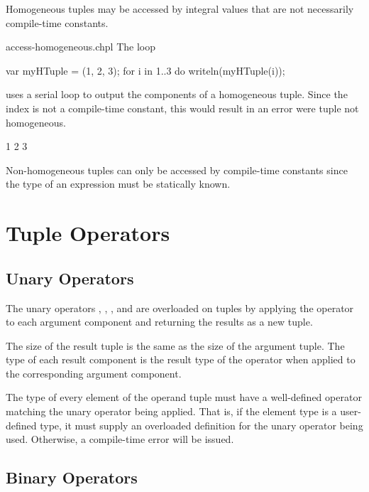 Homogeneous tuples may be accessed by integral values that are not
necessarily compile-time constants.

\begin{chapelexample}{access-homogeneous.chpl}
The loop
\begin{chapel}
var myHTuple = (1, 2, 3);
for i in 1..3 do
  writeln(myHTuple(i));
\end{chapel}
uses a serial loop to output the components of a homogeneous tuple.
Since the index is not a compile-time constant, this would result in
an error were tuple not homogeneous.
\begin{chapelpost}
\end{chapelpost}
\begin{chapeloutput}
1
2
3
\end{chapeloutput}
\end{chapelexample}

\begin{rationale}
Non-homogeneous tuples can only be accessed by compile-time constants
since the type of an expression must be statically known.
\end{rationale}

\section{Tuple Operators}
\label{Tuple_Operators}

\subsection{Unary Operators}
\label{Tuple_Unary_Operators}

The unary operators \chpl{\+}, \chpl{\-}, \chpl{\~}, and \chpl{\!} are
overloaded on tuples by applying the operator to each argument component
and returning the results as a new tuple.

The size of the result tuple is the same as the size of the
argument tuple. The type of each result component is the result
type of the operator when applied to the corresponding argument component.

The type of every element of the operand tuple must have a
well-defined operator matching the unary operator being applied.  That
is, if the element type is a user-defined type, it must supply an
overloaded definition for the unary operator being used.  Otherwise, a
compile-time error will be issued.

\subsection{Binary Operators}
\label{Tuple_Binary_Operators}

